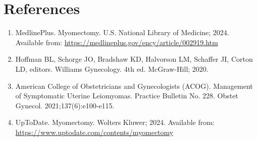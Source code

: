 \section*{References}
\begin{enumerate}
  \item MedlinePlus. Myomectomy. U.S. National Library of Medicine; 2024. Available from: \url{https://medlineplus.gov/ency/article/002919.htm}
  
  \item Hoffman BL, Schorge JO, Bradshaw KD, Halvorson LM, Schaffer JI, Corton LD, editors. Williams Gynecology. 4th ed. McGraw-Hill; 2020.
  
  \item American College of Obstetricians and Gynecologists (ACOG). Management of Symptomatic Uterine Leiomyomas. Practice Bulletin No. 228. Obstet Gynecol. 2021;137(6):e100-e115.
  
  \item UpToDate. Myomectomy. Wolters Kluwer; 2024. Available from: \url{https://www.uptodate.com/contents/myomectomy}
\end{enumerate}

\clearpage
